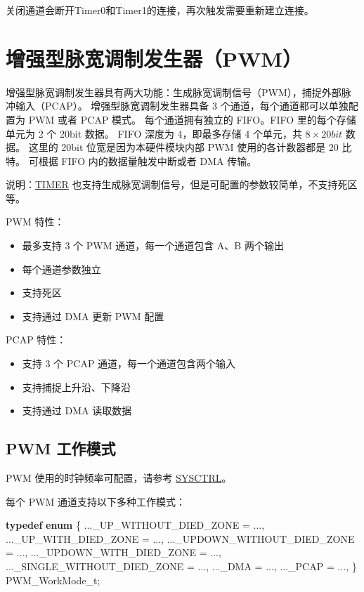\documentclass[
  12pt,
]{book}
\newenvironment{Shaded}{\begin{snugshade}}{\end{snugshade}}
\newcommand{\KeywordTok}[1]{\textcolor[rgb]{0.13,0.29,0.53}{\textbf{#1}}}
\newcommand{\NormalTok}[1]{#1}
\providecommand{\tightlist}{%
  \setlength{\itemsep}{0pt}\setlength{\parskip}{0pt}}
\begin{document}
关闭通道会断开Timer0和Timer1的连接，再次触发需要重新建立连接。

\hypertarget{ch-pwm}{%
\chapter{增强型脉宽调制发生器（PWM）}\label{ch-pwm}}

增强型脉宽调制发生器具有两大功能：生成脉宽调制信号（PWM），捕捉外部脉冲输入（PCAP）。
增强型脉宽调制发生器具备 3 个通道，每个通道都可以单独配置为 PWM 或者 PCAP 模式。
每个通道拥有独立的 FIFO。FIFO 里的每个存储单元为 2 个 20bit 数据。
FIFO 深度为 4，即最多存储 4 个单元，共 \(8 \times 20bit\) 数据。
这里的 20bit 位宽是因为本硬件模块内部 PWM 使用的各计数器都是 20 比特。
可根据 FIFO 内的数据量触发中断或者 DMA 传输。

说明：\protect\hyperlink{ch-timer}{TIMER} 也支持生成脉宽调制信号，但是可配置的参数较简单，不支持死区等。

PWM 特性：

\begin{itemize}
\tightlist
\item
  最多支持 3 个 PWM 通道，每一个通道包含 A、B 两个输出
\item
  每个通道参数独立
\item
  支持死区
\item
  支持通过 DMA 更新 PWM 配置
\end{itemize}

PCAP 特性：

\begin{itemize}
\tightlist
\item
  支持 3 个 PCAP 通道，每一个通道包含两个输入
\item
  支持捕捉上升沿、下降沿
\item
  支持通过 DMA 读取数据
\end{itemize}

\hypertarget{pwm-ux5de5ux4f5cux6a21ux5f0f}{%
\section{PWM 工作模式}\label{pwm-ux5de5ux4f5cux6a21ux5f0f}}

PWM 使用的时钟频率可配置，请参考 \protect\hyperlink{ch-sysctrl}{SYSCTRL}。

每个 PWM 通道支持以下多种工作模式：

\begin{Shaded}
\begin{Highlighting}[]
\KeywordTok{typedef} \KeywordTok{enum}
\NormalTok{\{}
\NormalTok{    ..._UP_WITHOUT_DIED_ZONE          = ...,}
\NormalTok{    ..._UP_WITH_DIED_ZONE             = ...,}
\NormalTok{    ..._UPDOWN_WITHOUT_DIED_ZONE      = ...,}
\NormalTok{    ..._UPDOWN_WITH_DIED_ZONE         = ...,}
\NormalTok{    ..._SINGLE_WITHOUT_DIED_ZONE      = ...,}
\NormalTok{    ..._DMA                           = ...,}
\NormalTok{    ..._PCAP                          = ...,}
\NormalTok{\} PWM_WorkMode_t;}
\end{Highlighting}
\end{Shaded}
\end{document}
